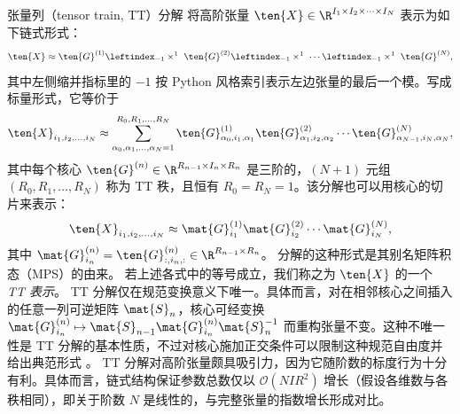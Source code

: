 张量列（tensor train, TT）分解 \cite{oseledets2011tensor} 将高阶张量 $\ten{X}\in\R^{I_1\times I_2\times \cdots\times I_N}$ 表示为如下链式形式：
\begin{equation}
    \ten{X} \approx \ten{G}^{(1)} \leftindex_{-1} \times^{1} \ \ten{G}^{(2)} \leftindex_{-1} \times^{1} \ \cdots \leftindex_{-1} \times^{1} \ \ten{G}^{(N)},
\end{equation}
其中左侧缩并指标里的 $-1$ 按 Python 风格索引表示左边张量的最后一个模。写成标量形式，它等价于
\begin{equation}
\ten{X}_{i_1, i_2,\dots, i_N} \approx \sum_{\alpha_0, \alpha_1, \dots, \alpha_N=1}^{R_0, R_1, \dots, R_N} \ten{G}^{(1)}_{\alpha_0, i_1, \alpha_1} \ten{G}^{(2)}_{\alpha_1, i_2, \alpha_2} \cdots \ten{G}^{(N)}_{\alpha_{N-1}, i_N, \alpha_N},
\end{equation}
其中每个核心 $\ten{G}^{(n)} \in \R^{R_{n-1} \times I_n \times R_n}$ 是三阶的，$(N+1)$ 元组 $(R_0, R_1, \ldots, R_N)$ 称为 TT 秩，且恒有 $R_0=R_N=1$。该分解也可以用核心的切片来表示：
\begin{equation}
\ten{X}_{i_1, i_2,\dots, i_N} \approx \mat{G}^{(1)}_{i_1}\mat{G}^{(2)}_{i_2}\cdots\mat{G}^{(N)}_{i_N},
\end{equation}
其中 $\mat{G}^{(n)}_{i_n} = \ten{G}^{(n)}_{:, i_n, :} \in\R^{R_{n-1}\times R_n}$。
分解的这种形式是其别名矩阵积态（MPS）的由来。
若上述各式中的等号成立，我们称之为 $\ten{X}$ 的一个 \emph{TT 表示}。
TT 分解仅在规范变换意义下唯一。具体而言，对在相邻核心之间插入的任意一列可逆矩阵 $\mat{S}_n$，核心可经变换 $\mat{G}^{(n)}_{i_n} \mapsto \mat{S}_{n-1} \mat{G}^{(n)}_{i_n} \mat{S}_n^{-1}$ 而重构张量不变。这种不唯一性是 TT 分解的基本性质，不过对核心施加正交条件可以限制这种规范自由度并给出典范形式 \cite{cichocki2015tensor}。
TT 分解对高阶张量颇具吸引力，因为它随阶数的标度行为十分有利。具体而言，链式结构保证参数总数仅以 $\mathcal{O}(N I R^2)$ 增长（假设各维数与各秩相同），即关于阶数 $N$ 是线性的，与完整张量的指数增长形成对比。

